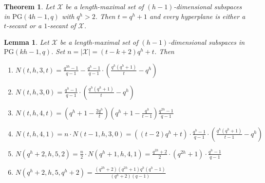 \documentclass[10pt,a4paper]{amsart}
\newtheorem{theorem}{Theorem}
\newtheorem{lemma}{Lemma}
\begin{document}
	\begin{theorem}\label{lem: k=4 maximal arc DNE}
		Let $\mathcal{X}$ be a length-maximal set of $(h-1)$-dimensional subspaces in $\mathrm{PG}(4h-1, q)$ with $q^h > 2$. Then $t=q^h+1$ and every hyperplane is either a $t$-secant or a $1$-secant of $\mathcal{X}$.
	\end{theorem}

	\begin{lemma}\label{lem: enumerating secants}
		Let $\mathcal{X}$ be a length-maximal set of $(h-1)$-dimensional subspaces in $\mathrm{PG}(kh-1,q)$. Set $n = |\mathcal{X}| = (t-k+2)q^h+t$. Then
		
		\begin{enumerate}
			\item $\displaystyle N(t,h,3,t) = \frac{q^{3h}-1}{q-1} -\frac{q^h-1}{q-1}\cdot\left(\frac{q^h(q^h+1)}{t}-q^h\right)$ \label{part 1: lem: enumerating secants}
			
			\item $\displaystyle N(t,h,3,0) = \frac{q^h-1}{q-1}\cdot\left(\frac{q^h(q^h+1)}{t}-q^h\right)$ \label{part 2: lem: enumerating secants}
			
			\item $\displaystyle N(t,h,4,t) = \left( q^h + 1 - \frac{2q^h}{t} \right) \left( q^h + 1 - \frac{q^h}{t-1} \right) \frac{q^{2h}-1}{q-1}$ \label{part 3: lem: enumerating secants}
			
			\item $\displaystyle N(t,h,4,1) = n\cdot N(t-1,h,3,0) =\left((t-2)q^h + t\right) \cdot \frac{q^h-1}{q-1}\cdot \left(  \frac{q^h(q^h+1)}{t-1}-q^h \right)$ \label{part 4: lem: enumerating secants}
			
			\item $\displaystyle N(q^h+2,h,5,2) = \frac{n}{2}\cdot N(q^h+1,h,4,1) = \frac{q^{2h}+2}{2}\cdot (q^{2h}+1)\cdot\frac{q^h-1}{q-1}$ \label{part 5: lem: enumerating secants}
			
			\item $\displaystyle N(q^h+2,h,5,q^h+2) = \frac{(q^{2h}+2)(q^{2h}+1)q^h(q^h-1)}{(q^h+2)(q-1)}$ \label{part 6: lem: enumerating secants}
		\end{enumerate}
	\end{lemma}
\end{document}

